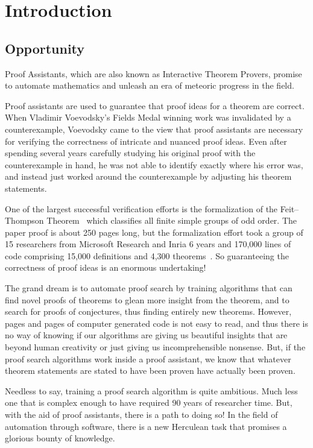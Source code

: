\documentclass{article}
\theoremstyle{definition}
\begin{document}
\clearpage

\section{Introduction}
\subsection{Opportunity}
Proof Assistants, which are also known as Interactive Theorem Provers, promise to automate mathematics and unleash an era of meteoric progress in the field.

Proof assistants are used to guarantee that proof ideas for a theorem are correct. When Vladimir Voevodsky's Fields Medal winning work was invalidated by a counterexample, Voevodsky came to the view that proof assistants are necessary for verifying the correctness of intricate and nuanced proof ideas. Even after spending several years carefully studying his original proof with the counterexample in hand, he was not able to identify exactly where his error was, and instead just worked around the counterexample by adjusting his theorem statements. 

One of the largest successful verification efforts is the formalization of the Feit--Thompson Theorem~\cite{Gonthier2013} which classifies all finite simple groups of odd order. The paper proof is about 250 pages long, but the formalization effort took a group of 15 researchers from Microsoft Research and Inria 6 years and 170,000 lines of code comprising 15,000 definitions and 4,300 theorems~\cite{Knies2012}. So guaranteeing the correctness of proof ideas is an enormous undertaking!

The grand dream is to automate proof search by training algorithms that can find novel proofs of theorems to glean more insight from the theorem, and to search for proofs of conjectures, thus finding entirely new theorems. However, pages and pages of computer generated code is not easy to read, and thus there is no way of knowing if our algorithms are giving us beautiful insights that are beyond human creativity or just giving us incomprehensible nonsense. But, if the proof search algorithms work inside a proof assistant, we know that whatever theorem statements are stated to have been proven have actually been proven.

Needless to say, training a proof search algorithm is quite ambitious. Much less one that is complex enough to have required 90 years of researcher time. But, with the aid of proof assistants, there is a path to doing so! In the field of automation through software, there is a new Herculean task that promises a glorious bounty of knowledge.
\end{document}
